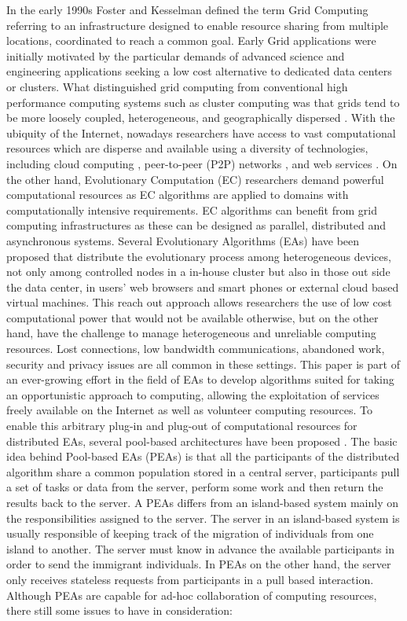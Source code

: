 In the early 1990s Foster and Kesselman defined the term Grid Computing \cite{Foster:1998} referring to an infrastructure designed to enable resource sharing from multiple locations, coordinated to reach a common goal. Early Grid applications were initially motivated by the particular demands of advanced science and engineering applications \cite{Baxevanidis:2002} seeking a low cost alternative to dedicated data centers or clusters. What distinguished grid computing from conventional high performance computing systems such as cluster computing was that grids tend to be more loosely coupled, heterogeneous, and geographically dispersed \cite{Foster:1998}. With the ubiquity of the Internet, nowadays researchers have access to vast  computational resources which are disperse and available using a diversity of technologies, including cloud computing \cite{cloud, varia2008cloud}, peer-to-peer (P2P) networks  \cite{Oram:2001}, and web services \cite{Curbera:2002}. On the other hand, Evolutionary Computation (EC) researchers demand powerful computational resources as EC algorithms are applied to domains with computationally intensive requirements. EC algorithms can benefit from grid computing infrastructures as these can be designed as parallel, distributed and asynchronous systems. Several Evolutionary Algorithms (EAs) have been proposed that distribute the evolutionary process among heterogeneous devices, not only among controlled nodes in a in-house cluster but also in those out side the data center, in users' web browsers and smart phones or external cloud based virtual machines. This reach out approach allows researchers the use of low cost computational power that would not be available otherwise, but on the other hand, have the challenge to manage heterogeneous and unreliable computing resources. Lost connections, low bandwidth communications, abandoned work, security and privacy issues are all common in these settings. 
This paper is part of an ever-growing effort in the field of EAs to develop algorithms suited for taking an opportunistic approach to computing, allowing the exploitation of services freely available on the Internet as well as volunteer computing resources. To enable this arbitrary plug-in and plug-out of computational resources for distributed EAs, several pool-based architectures have been proposed \cite{PoolvsIsland}. The basic idea behind Pool-based EAs (PEAs) is that all the participants of the distributed algorithm share a common population stored in a central server, participants pull a set of tasks or data from the server, perform some work and then return the results back to the server. A PEAs differs from an island-based system mainly on the responsibilities assigned to the server. The server in an island-based system is usually responsible of keeping track of the migration of individuals from one island to another. The server must know in advance the available participants in order to send the immigrant individuals. In PEAs on the other hand, the server only receives stateless requests from participants in a pull based interaction. Although PEAs are capable for ad-hoc collaboration of computing resources, there still some issues to have in consideration:
